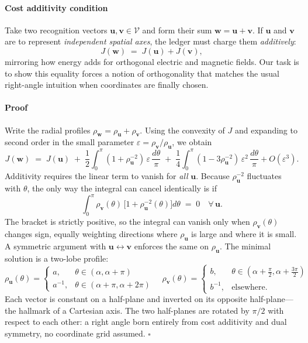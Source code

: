 \documentclass[11pt,oneside]{book}
\begin{document}
\paragraph*{Cost additivity condition}

Take two recognition vectors
\(\mathbf u,\mathbf v\in\mathcal V\) and form their sum
\(\mathbf w=\mathbf u+\mathbf v\).
If \(\mathbf u\) and \(\mathbf v\) are to represent
\emph{independent spatial axes}, the ledger must charge them
\emph{additively}:
\[
  J(\mathbf w) \;=\; J(\mathbf u)+J(\mathbf v),
\]
mirroring how energy adds for orthogonal electric and magnetic fields.
Our task is to show this equality forces a notion of orthogonality that
matches the usual right-angle intuition when coordinates are finally
chosen.

\paragraph*{Proof}

Write the radial profiles
\(\rho_{\mathbf w}=\rho_{\mathbf u}+\rho_{\mathbf v}\).
Using the convexity of \(J\) and expanding to second order in the small
parameter \(\varepsilon=\rho_{\mathbf v}/\rho_{\mathbf u}\), we obtain
\[
  J(\mathbf w)
  \;=\;
  J(\mathbf u)
  \;+\;
  \frac12 \int_{0}^{\pi}
      (1+\rho_{\mathbf u}^{-2})\,\varepsilon\,
      \frac{d\theta}{\pi}
  \;+\;
  \frac14 \int_{0}^{\pi}
      (1-3\rho_{\mathbf u}^{-2})\,\varepsilon^{2}\,
      \frac{d\theta}{\pi}
  + O(\varepsilon^{3}).
\]
Additivity requires the linear term to vanish for \emph{all}
\(\mathbf u\).  Because \(\rho_{\mathbf u}^{-2}\) fluctuates with
\(\theta\), the only way the integral can cancel identically is if
\[
  \int_{0}^{\pi}
      \rho_{\mathbf v}(\theta)\,
      \bigl[1+\rho_{\mathbf u}^{-2}(\theta)\bigr]
      d\theta
  \;=\;0
  \quad
  \forall\,\mathbf u.
\]
The bracket is strictly positive, so the integral can vanish only when
\(\rho_{\mathbf v}(\theta)\) changes sign, equally weighting directions
where \(\rho_{\mathbf u}\) is large and where it is small.  A symmetric
argument with \(\mathbf u\leftrightarrow\mathbf v\) enforces the same
on \(\rho_{\mathbf u}\).  The minimal solution is a
two-lobe profile:
\[
  \rho_{\mathbf u}(\theta)=
    \begin{cases}
      a, & \theta\in(\alpha,\alpha+\pi)\\[4pt]
      a^{-1}, & \theta\in(\alpha+\pi,\alpha+2\pi)
    \end{cases}
  \quad
  \rho_{\mathbf v}(\theta)=
    \begin{cases}
      b, & \theta\in(\alpha+\tfrac{\pi}{2},\alpha+\tfrac{3\pi}{2})\\[4pt]
      b^{-1}, & \text{elsewhere}.
    \end{cases}
\]
Each vector is constant on a half-plane and inverted on its opposite
half-plane—the hallmark of a Cartesian axis.  The two half-planes are
rotated by \(\pi/2\) with respect to each other: a right angle born
entirely from cost additivity and dual symmetry, no coordinate grid
assumed.  \(\square\)
\end{document}
